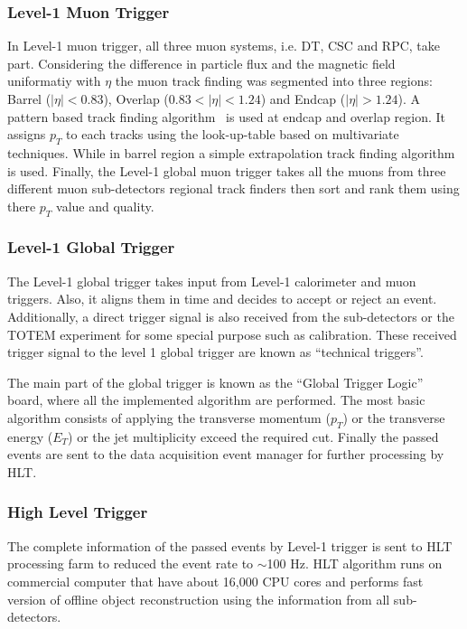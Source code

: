{{{%


\subsubsection{Level-1 Muon Trigger} %
\label{ssub:l1_muon_trigger}
In Level-1 muon trigger, all three muon systems, i.e. DT, CSC and RPC, take part. Considering the difference in particle flux and the magnetic field uniformatiy with $\eta$ the muon track finding was segmented into three regions: Barrel ($|\eta|<0.83$), Overlap ($0.83<|\eta| < 1.24$) and Endcap ($|\eta|>1.24$). A pattern based track finding algorithm~\cite{Eroe2008} is used at endcap and overlap region. It assigns $p_T$ to each tracks using the look-up-table based on multivariate techniques. While in barrel region a simple extrapolation track finding algorithm is used. Finally, the Level-1 global muon trigger takes all the muons from three different muon sub-detectors regional track finders then sort and rank them using there $p_T$ value and quality.


\subsubsection{Level-1 Global Trigger} %
\label{ssub:l1_global_trigger}
The Level-1 global trigger takes input from Level-1 calorimeter and  muon triggers. Also, it aligns them in time and  decides to accept or reject an event. Additionally, a direct trigger signal is also received from the sub-detectors or the TOTEM experiment for some special purpose such as calibration. These received trigger signal to the level 1 global trigger are known as ``technical triggers''. 

The main part of the global trigger is known as the ``Global Trigger Logic'' board, where all the implemented algorithm are performed. The most basic algorithm consists of applying the transverse momentum ($p_T$) or the transverse energy ($E_T$) or the jet multiplicity exceed the required cut. Finally the passed events are sent to the data acquisition event manager for further processing by HLT.



\subsubsection{High Level Trigger} %
\label{ssub:high_level_trigger}
The complete information of the passed events by Level-1 trigger is sent to HLT processing farm to reduced the event rate to $\sim$100 Hz. HLT algorithm runs on commercial computer that have about 16,000 CPU cores and performs fast version of offline object reconstruction using the information from all sub-detectors. 

}}}
